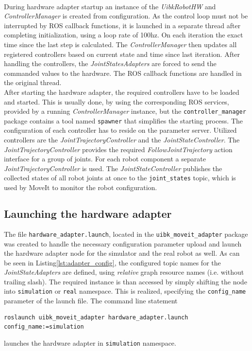 \begin{minipage}{\linewidth}

\end{minipage} \\

During hardware adapter startup an instance of the \emph{UibkRobotHW} and \emph{ControllerManager} is created from configuration. As the control loop must not be interrupted by ROS callback functions, it is launched in a separate thread after completing initialization, using a loop rate of 100hz. On each iteration the exact time since the last step is calculated. The \emph{ControllerManager} then updates all registered controllers based on current state and time since last iteration. After handling the controllers, the \emph{JointStatesAdapters} are forced to send the commanded values to the hardware. The ROS callback functions are handled in the original thread.\\

After starting the hardware adapter, the required controllers have to be loaded and started. This is usually done, by using the corresponding ROS services, provided by a running \emph{ControllerManager} instance, but the \texttt{controller\_manager} package contains a tool named \texttt{spawner} that simplifies the starting process. The configuration of each controller has to reside on the parameter server. Utilized controllers are the \emph{JointTrajectoryController} and the \emph{JointStateController}. The \emph{JointTrajectoryController} provides the required \emph{FollowJointTrajectory} action interface for a group of joints. For each robot component a separate \emph{JointTrajectoryController} is used. The \emph{JointStateController} publishes the collected states of all robot joints at once to the \texttt{joint\_states} topic, which is used by MoveIt to monitor the robot configuration.

\subsection{Launching the hardware adapter}
\label{sec:launch_moveit}

The file \texttt{hardware\_adapter.launch}, located in the \texttt{uibk\_moveit\_adapter} package was created to handle the necessary configuration parameter upload and launch the hardware adapter node for the simulator and the real robot as well. As can be seen in Listing\ref{lst:adapter_config}, the configured topic names for the \emph{JointStateAdapters} are defined, using \emph{relative} graph resource names (i.e. without trailing slash). The required instance is than accessed by simply shifting the node into \texttt{simulation} or \texttt{real} namespace. This is realized, specifying the \texttt{config\_name} parameter of the launch file. The command line statement
\begin{verbatim}
roslaunch uibk_moveit_adapter hardware_adapter.launch config_name:=simulation
\end{verbatim}
launches the hardware adapter in \texttt{simulation} namespace.\\

